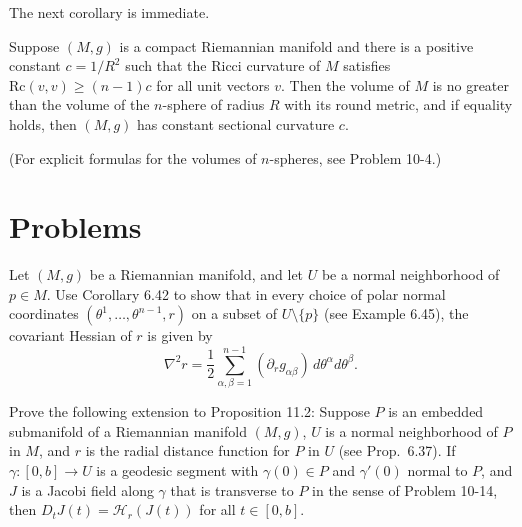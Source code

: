 The next corollary is immediate.

\begin{corollary}
\label{cor:ricci-volume-comparison}

Suppose $(M,g)$ is a compact Riemannian manifold and there is a positive constant $c = 1/R^2$ such that the Ricci curvature of $M$ satisfies $\mathrm{Rc}(v,v) \ge (n-1)c$ for all unit vectors $v$. Then the volume of $M$ is no greater than the volume of the $n$-sphere of radius $R$ with its round metric, and if equality holds, then $(M,g)$ has constant sectional curvature $c$.
\end{corollary}

(For explicit formulas for the volumes of $n$-spheres, see Problem 10-4.)

\section{Problems}

\begin{exercise}
\label{prob:hessian-polar-coordinates}

Let $(M,g)$ be a Riemannian manifold, and let $U$ be a normal neighborhood of $p \in M$. Use Corollary 6.42 to show that in every choice of polar normal coordinates $(\theta^1,\ldots,\theta^{n-1},r)$ on a subset of $U \setminus \{p\}$ (see Example 6.45), the covariant Hessian of $r$ is given by
\[
\nabla^2 r = \frac{1}{2} \sum_{\alpha,\beta=1}^{n-1} (\partial_r g_{\alpha\beta}) \, d\theta^\alpha d\theta^\beta.
\]
\end{exercise}

\begin{exercise}
\label{prob:jacobi-field-submanifold}

Prove the following extension to Proposition 11.2: Suppose $P$ is an embedded submanifold of a Riemannian manifold $(M,g)$, $U$ is a normal neighborhood of $P$ in $M$, and $r$ is the radial distance function for $P$ in $U$ (see Prop.\ 6.37). If $\gamma : [0,b] \to U$ is a geodesic segment with $\gamma(0) \in P$ and $\gamma'(0)$ normal to $P$, and $J$ is a Jacobi field along $\gamma$ that is transverse to $P$ in the sense of Problem 10-14, then $D_t J(t) = \mathcal{H}_r(J(t))$ for all $t \in [0,b]$.
\end{exercise}


